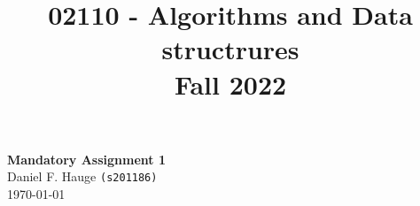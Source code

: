 \documentclass[a4paper]{article}
\begin{document}
\title{02110 - Algorithms and Data structrures \\ Fall 2022}

\date{} %
\color{black}
\maketitle
\begin{center}
{ \huge \bfseries Mandatory Assignment 1}\\

\vspace{.25cm}
Daniel F. Hauge \texttt{(s201186)}\\


\vspace{.25cm}
\vfill
\today
\end{center}


\medskip
\newpage


\end{document}
